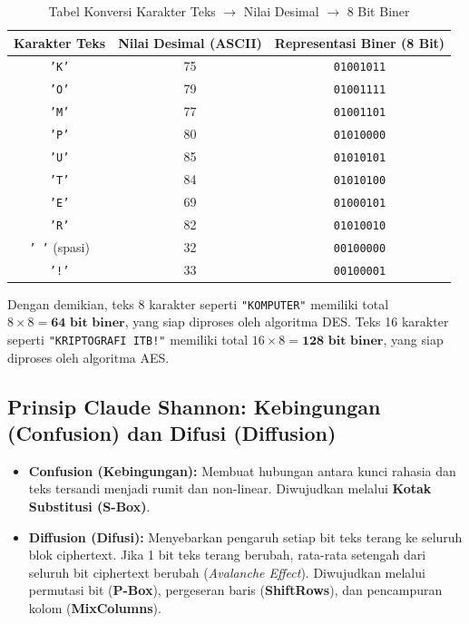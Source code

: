 \documentclass[11pt,a4paper]{article}
\begin{document}
\begin{table}[H]
\centering
\caption{Tabel Konversi Karakter Teks $\to$ Nilai Desimal $\to$ 8 Bit Biner}
\label{tab:ascii_primer}
\vspace{0.2cm}
\begin{tabular}{ccc}
\toprule
\textbf{Karakter Teks} & \textbf{Nilai Desimal (ASCII)} & \textbf{Representasi Biner (8 Bit)} \\
\midrule
\texttt{'K'} & 75  & \texttt{01001011} \\
\texttt{'O'} & 79  & \texttt{01001111} \\
\texttt{'M'} & 77  & \texttt{01001101} \\
\texttt{'P'} & 80  & \texttt{01010000} \\
\texttt{'U'} & 85  & \texttt{01010101} \\
\texttt{'T'} & 84  & \texttt{01010100} \\
\texttt{'E'} & 69  & \texttt{01000101} \\
\texttt{'R'} & 82  & \texttt{01010010} \\
\texttt{' '} (spasi) & 32 & \texttt{00100000} \\
\texttt{'!'} & 33  & \texttt{00100001} \\
\bottomrule
\end{tabular}
\end{table}

Dengan demikian, teks 8 karakter seperti \texttt{"KOMPUTER"} memiliki total $8 \times 8 = \mathbf{64\text{ bit biner}}$, yang siap diproses oleh algoritma DES. Teks 16 karakter seperti \texttt{"KRIPTOGRAFI ITB!"} memiliki total $16 \times 8 = \mathbf{128\text{ bit biner}}$, yang siap diproses oleh algoritma AES.

\subsection{Prinsip Claude Shannon: Kebingungan (Confusion) dan Difusi (Diffusion)}
\begin{itemize}[leftmargin=*]
    \item \textbf{Confusion (Kebingungan):} Membuat hubungan antara kunci rahasia dan teks tersandi menjadi rumit dan non-linear. Diwujudkan melalui \textbf{Kotak Substitusi (S-Box)}.
    \item \textbf{Diffusion (Difusi):} Menyebarkan pengaruh setiap bit teks terang ke seluruh blok ciphertext. Jika 1 bit teks terang berubah, rata-rata setengah dari seluruh bit ciphertext berubah (\textit{Avalanche Effect}). Diwujudkan melalui permutasi bit (\textbf{P-Box}), pergeseran baris (\textbf{ShiftRows}), dan pencampuran kolom (\textbf{MixColumns}).
\end{itemize}
\end{document}
